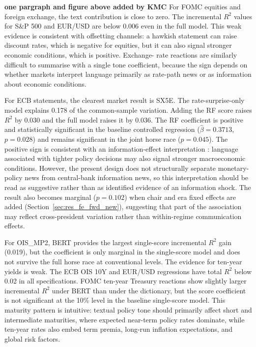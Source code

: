 \textbf{one pargraph and figure above added by KMC 
}
For FOMC equities and foreign exchange, the text contribution is close to zero.
The incremental $R^2$ values for S\&P 500 and EUR/USD are below 0.006 even in
the full model. This weak evidence is consistent with offsetting channels: a
hawkish statement can raise discount rates, which is negative for equities, but
it can also signal stronger economic conditions, which is positive. Exchange-
rate reactions are similarly difficult to summarise with a single tone
coefficient, because the sign depends on whether markets interpret language
primarily as rate-path news or as information about economic conditions.

For ECB statements, the clearest market result is SX5E. The
rate-surprise-only model explains 0.178 of the common-sample variation. Adding
the RF score raises $R^2$ by 0.030 and the full model raises it by 0.036. The
RF coefficient is positive and statistically significant in the baseline
controlled regression ($\hat{\beta}=0.3713$, $p=0.028$) and remains significant
in the joint horse race ($p=0.045$). The positive sign is consistent with an
information-effect interpretation \citep{nakamura2018,jarocinski2020}: language
associated with tighter policy decisions may also signal stronger macroeconomic
conditions. However, the present design does not structurally separate
monetary-policy news from central-bank information news, so this interpretation
should be read as suggestive rather than as identified evidence of an
information shock. The result also becomes marginal ($p=0.102$) when chair and
era fixed effects are added (Section~\ref{sec:res_fe_fwd_new}), suggesting
that part of the association may reflect cross-president variation rather than
within-regime communication effects.

For OIS\_MP2, BERT provides the largest single-score incremental $R^2$
gain (0.019), but the coefficient is only marginal in the single-score model
and does not survive the full horse race at conventional levels. The evidence
for ten-year yields is weak. The ECB OIS 10Y and EUR/USD regressions have
total $R^2$ below 0.02 in all specifications. FOMC ten-year Treasury reactions
show slightly larger incremental $R^2$ under BERT than under the dictionary,
but the score coefficient is not significant at the 10\% level in the baseline
single-score model. This maturity pattern is intuitive: textual policy tone
should primarily affect short and intermediate maturities, where expected
near-term policy rates dominate, while ten-year rates also embed term premia,
long-run inflation expectations, and global risk factors.


